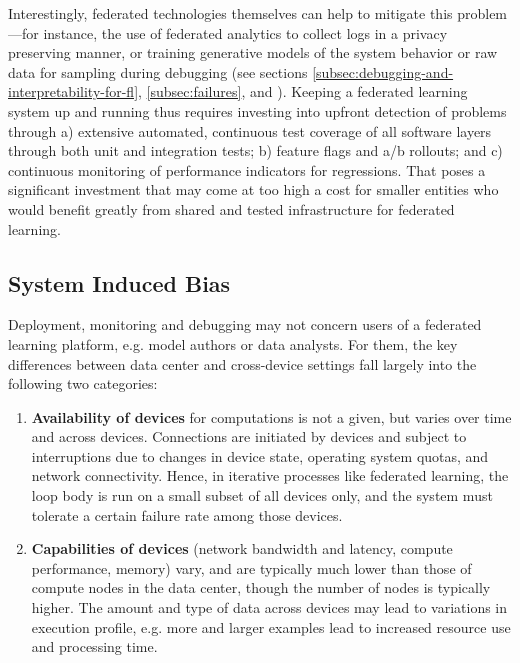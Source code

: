 \documentclass[11pt]{article}
\begin{document}
Interestingly, federated technologies themselves can help to mitigate this problem---for instance, the use of federated analytics \citep{fablog20} to collect logs in a privacy preserving manner, or training generative models of the system behavior or raw data for sampling during debugging (see sections \ref{subsec:debugging-and-interpretability-for-fl}, \ref{subsec:failures}, and \citep{augenstein2019generative}).
Keeping a federated learning system up and running thus requires investing into upfront detection of problems through a) extensive automated, continuous test coverage of all software layers through both unit and integration tests; b) feature flags and a/b rollouts; and c) continuous monitoring of performance indicators for regressions. That poses a significant investment that may come at too high a cost for smaller entities who would benefit greatly from shared and tested infrastructure for federated learning.

\subsection{System Induced Bias}
\label{subsec:systems-system-induced-bias}
Deployment, monitoring and debugging may not concern users of a federated learning platform, e.g. model authors or data analysts. For them, the key differences between data center and cross-device settings fall largely into the following two categories:

\begin{enumerate}
    \item \textbf{Availability of devices} for computations is not a given, but varies over time and across devices. Connections are initiated by devices and subject to interruptions due to changes in device state, operating system quotas, and network connectivity. Hence, in iterative processes like federated learning, the loop body is run on a small subset of all devices only, and the system must tolerate a certain failure rate among those devices.
    \item \textbf{Capabilities of devices} (network bandwidth and latency, compute performance, memory) vary, and are typically much lower than those of compute nodes in the data center, though the number of nodes is typically higher. The amount and type of data across devices may lead to variations in execution profile, e.g. more and larger examples lead to increased resource use and processing time.
\end{enumerate}
\end{document}
